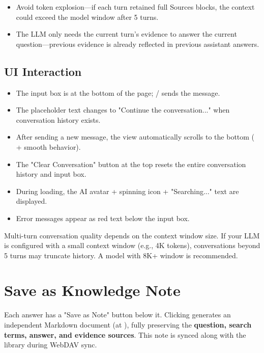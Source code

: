 \begin{itemize}
  \item Avoid token explosion---if each turn retained full Sources blocks, the context could exceed
    the model window after 5 turns.
  \item The LLM only needs the current turn's evidence to answer the current question---previous
    evidence is already reflected in previous assistant answers.
\end{itemize}

\subsection{UI Interaction}

\begin{itemize}
  \item The input box is at the bottom of the page;  /  sends the
    message.
  \item The placeholder text changes to "Continue the conversation..." when conversation history
    exists.
  \item After sending a new message, the view automatically scrolls to the bottom
    ( + smooth behavior).
  \item The "Clear Conversation" button at the top resets the entire conversation history and input
    box.
  \item During loading, the AI avatar + spinning icon + "Searching..." text are displayed.
  \item Error messages appear as red text below the input box.
\end{itemize}

\begin{tipbox}
Multi-turn conversation quality depends on the context window size. If your LLM is configured with
a small context window (e.g., 4K tokens), conversations beyond 5 turns may truncate history. A
model with 8K+ window is recommended.
\end{tipbox}

\section{Save as Knowledge Note}

Each answer has a "Save as Note" button below it. Clicking generates an independent Markdown
document (at ), fully preserving the \textbf{question, search
terms, answer, and evidence sources}. This note is synced along with the library during WebDAV
sync.


